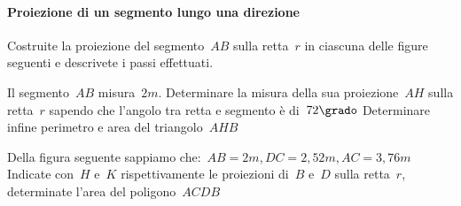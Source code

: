 \paragraph{Proiezione di un segmento lungo una direzione}

\begin{esercizio}
\label{ese:G.11}
Costruite la proiezione del segmento~$AB$ sulla retta~$r$ in ciascuna delle 
figure seguenti e descrivete i passi effettuati.
\begin{center}
\begin {inaccessibleblock}
 
\end {inaccessibleblock}
\end{center}
\end{esercizio}

\begin{multicols}{2}
 \begin{esercizio}
\label{ese:G.12}
Il segmento~$AB$ misura~$2\unit{m}$. Determinare la 
misura della sua proiezione~$AH$ sulla retta~$r$ sapendo che l'angolo tra retta 
e segmento è di~$72\grado$ Determinare infine perimetro e area del 
triangolo~$AHB$
\begin{center}
 
\end{center}
\end{esercizio}

\begin{esercizio}
\label{ese:G.13}
Della figura seguente sappiamo 
che:~${AB}=2\unit{m}$,\,${DC}=2,52\unit{m}$,\,${AC}=3,76\unit{m}$
Indicate con~$H$ e~$K$ rispettivamente le proiezioni di~$B$ e~$D$ sulla 
retta~$r$, determinate l'area del poligono~$ACDB$
\begin{center}
 
\end{center}
\end{esercizio}
\end{multicols}

%  
%  
%  

